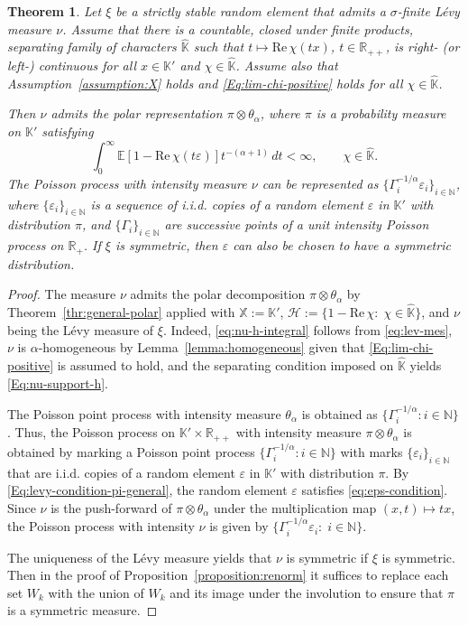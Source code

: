 \documentclass[12pt]{amsart}
\numberwithin{equation}{section}
\numberwithin{figure}{section}
\theoremstyle{plain} \newtheorem{theorem}{Theorem}[section]
\theoremstyle{plain} \newtheorem{proposition}[theorem]{Proposition}
\theoremstyle{plain} \newtheorem{lemma}[theorem]{Lemma}
\theoremstyle{plain} \newtheorem{corollary}[theorem]{Corollary}
\theoremstyle{definition} \newtheorem{definition}[theorem]{Definition}
\theoremstyle{definition} \newtheorem{notation}[theorem]{Notation}
\theoremstyle{remark} \newtheorem{remark}[theorem]{Remark}
\theoremstyle{remark} \newtheorem{example}[theorem]{Example}
\theoremstyle{definition} \newtheorem{assumption}{Assumption}
\newcommand{\bE}{\mathbb{E}}
\newcommand{\bK}{\mathbb{K}}
\newcommand{\bN}{\mathbb{N}}
\newcommand{\bR}{\mathbb{R}}
\newcommand{\bX}{\mathbb{X}}
\newcommand{\cH}{\mathcal{H}}
\newcommand{\bKH}{\hat{\bK}}
\renewcommand{\epsilon}{\varepsilon}
\newcommand{\eps}{\epsilon}
\renewcommand{\Re}{\mathrm{Re}\,}
\begin{document}
\begin{theorem}
  \label{thr:levy-k-separating-countable}
  Let $\xi$ be a strictly stable random element that admits a
  $\sigma$-finite L\'evy measure $\nu$.  Assume that there is a
  countable, closed under finite products, separating family of
  characters $\bKH$ such that $t \mapsto \Re\chi(tx)$, $t\in\bR_{++}$,
  is right- (or left-) continuous for all $x\in\bK'$ and $\chi \in
  \bKH$. Assume also that Assumption~\ref{assumption:X} holds and
  \eqref{Eq:lim-chi-positive} holds for all $\chi\in\bKH$.

  Then $\nu$ admits the polar representation
  $\pi\otimes\theta_\alpha$, where $\pi$ is a probability measure on
  $\bK'$ satisfying
  \begin{equation}
    \label{eq:eps-condition}
    \int_0^\infty \bE[1-\Re\chi(t\eps)] t^{-(\alpha+1)} \, dt <\infty,
    \qquad \chi\in\bKH.
  \end{equation}
  The Poisson process with intensity measure $\nu$ can be represented
  as $\{\Gamma_i^{-1/\alpha}\eps_i\}_{i\in\bN}$, where
  $\{\eps_i\}_{i\in\bN}$ is a sequence of i.i.d. copies of a random
  element $\eps$ in $\bK'$ with distribution $\pi$, and
  $\{\Gamma_i\}_{i\in\bN}$ are successive points of a unit intensity
  Poisson process on $\bR_+$.  If $\xi$ is symmetric, then $\eps$ can
  also be chosen to have a symmetric distribution.
\end{theorem}
\begin{proof}
  The measure $\nu$ admits the polar decomposition
  $\pi\otimes\theta_\alpha$ by Theorem~\ref{thr:general-polar} applied
  with $\bX:=\bK'$, $\cH := \{1 - \Re \chi: \; \chi \in \bKH\}$, and
  $\nu$ being the L\'evy measure of $\xi$. Indeed,
  \eqref{eq:nu-h-integral} follows from \eqref{eq:lev-mes}, $\nu$ is
  $\alpha$-homogeneous by Lemma~\ref{lemma:homogeneous} given that
  \eqref{Eq:lim-chi-positive} is assumed to hold, and the separating
  condition imposed on $\bKH$ yields \eqref{Eq:nu-support-h}.

  The Poisson point process with intensity measure $\theta_\alpha$ is
  obtained as $\{\Gamma_i^{-1/\alpha}: i\in\bN\}$. Thus, the Poisson
  process on $\bK'\times \bR_{++}$ with intensity measure
  $\pi\otimes\theta_\alpha$ is obtained by marking a Poisson point
  process $\{\Gamma_i^{-1/\alpha}: i\in\bN\}$ with marks
  $\{\eps_i\}_{i\in\bN}$ that are i.i.d. copies of a random element
  $\eps$ in $\bK'$ with distribution $\pi$. By
  \eqref{Eq:levy-condition-pi-general}, the random element $\eps$
  satisfies \eqref{eq:eps-condition}. Since $\nu$ is the push-forward
  of $\pi\otimes\theta_\alpha$ under the multiplication map
  $(x,t)\mapsto tx$, the Poisson process with intensity $\nu$ is given
  by $\{\Gamma_i^{-1/\alpha}\eps_i:\; i\in\bN\}$.
  
  The uniqueness of the L\'evy measure yields that $\nu$ is symmetric
  if $\xi$ is symmetric. Then in the proof of
  Proposition~\ref{proposition:renorm} it suffices to replace each set
  $W_k$ with the union of $W_k$ and its image under the involution to
  ensure that $\pi$ is a symmetric measure.
\end{proof}
\end{document}
